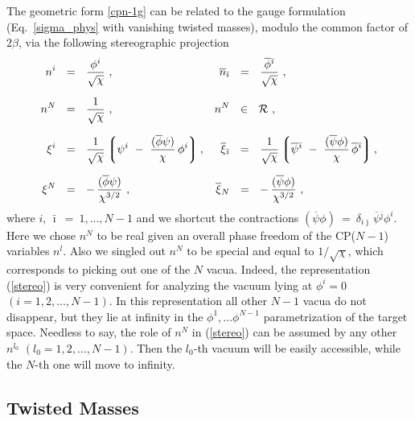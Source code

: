 \documentclass[12pt]{article}
\newcommand{\ov}{\overline}
\newcommand{\mc}[1]{\mathcal{#1}}
\newcommand{\lgr}{\left\lgroup}
\newcommand{\rgr}{\right\rgroup}
\newcommand{\bi}{{\bar \imath}}
\newcommand{\bj}{{\bar \jmath}}
\begin{document}
	The geometric form \eqref{cpn-1g} can be related to the gauge formulation (Eq.~\eqref{sigma_phys} with
	vanishing twisted masses), modulo the common factor of $ 2\beta $, via the following stereographic projection
\begin{align}
%
\notag
	n^i & ~~=~~ \frac{\phi^i}{\sqrt{\chi}}~,
	& 
	\ov{n}_\bi & ~~=~~ \frac{\ov{\phi}{}^\bi}{\sqrt{\chi}}~,
\\[2mm]
%
\label{stereo}
	n^N & ~~=~~ \frac{1}{\sqrt{\chi}}~,
	& n^N & ~~\in~~ \mc{R}~,
\\[2mm]
%
\notag
	\xi^i & ~~=~~ \frac{1}{\sqrt{\chi}} \lgr \psi^i ~-~ \frac{(\ov{\phi}\psi)}{\chi}\,\phi^i \rgr,
	& 
	\ov{\xi}{}_\bi & ~~=~~ \frac{1}{\sqrt{\chi}} 
					\lgr \ov{\psi}{}^\bi ~-~ \frac{(\ov{\psi}\phi)}{\chi}\, \ov{\phi}{}^\bi \rgr,
\\[2mm]
%
\notag
	\xi^N & ~~=~~ -\, \frac{(\ov{\phi} \psi)}{\chi^{3/2}}~,
	&
	\ov{\xi}{}_N & ~~=~~ -\, \frac{(\ov{\psi} \phi)}{\chi^{3/2}}~,
\end{align}
	where $	i,\, \bi ~=~ 1, ..., N-1 $ and we shortcut the contractions 
	$ (\ov{\psi} \phi) ~=~ \delta_{i\bj}\, \ov{\psi}{}^\bj \phi^i $.
	Here we chose $ n^N $ to be real given an overall phase freedom of the CP($N-1$) variables $ n^l $.
	Also we singled out $ n^N $ to be special and equal to $ 1/\sqrt{\chi} $, 
	which corresponds to picking out one of the $ N $ vacua. Indeed,
	the representation (\ref{stereo}) is very convenient for
	analyzing the vacuum lying at $\phi^i=0$ $(i=1,2, ..., N-1)$. In this representation all other $N-1$ vacua do not disappear, 
	but they lie at infinity in the $\phi^1, ... \phi^{N-1}$ parametrization of the target space.
Needless to say, the role of $n^N$ in (\ref{stereo}) can be assumed by any other
$n^{l_0}$  $(l_0 = 1,2, ..., N-1)$.	Then the $l_0$-th vacuum will be easily accessible, while
the $N$-th one will move to infinity.


\subsection{Twisted Masses}
\label{twim}
\end{document}
